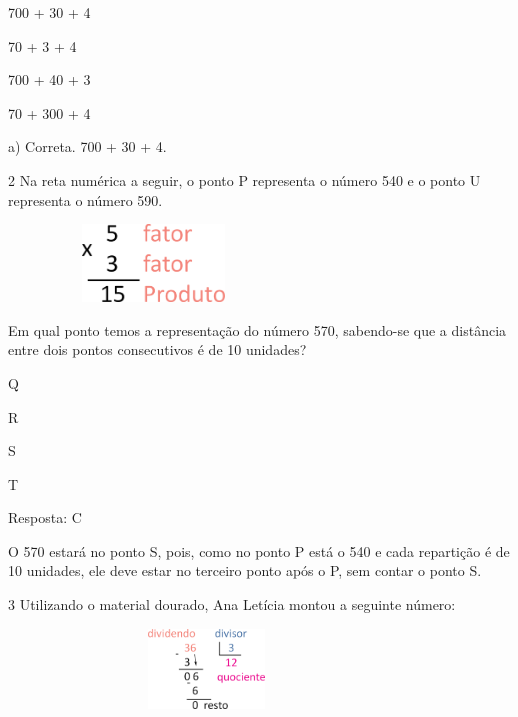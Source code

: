 \begin{escolha}

\item
  700 + 30 + 4
\item
  70 + 3 + 4
\item
  700 + 40 + 3
\item
  70 + 300 + 4
\end{escolha}

a) Correta. 700 + 30 + 4.



\num{2} Na reta numérica a seguir, o ponto P representa o número 540 e o ponto U
representa o número 590.

\includegraphics[width=3.03205in,height=0.81228in]{media/image12.png}


Em qual ponto temos a representação do número 570, sabendo-se que a
distância entre dois pontos consecutivos é de 10 unidades?

\begin{escolha}

\item
  Q
\item
  R
\item
  S
\item
  T
\end{escolha}

Resposta: C

O 570 estará no ponto S, pois, como no ponto P está o 540 e cada
repartição é de 10 unidades, ele deve estar no terceiro ponto após o P,
sem contar o ponto S.

\num{3} Utilizando o material dourado, Ana Letícia montou a seguinte número:

\includegraphics[width=4.13369in,height=0.83341in]{media/image13.png}


